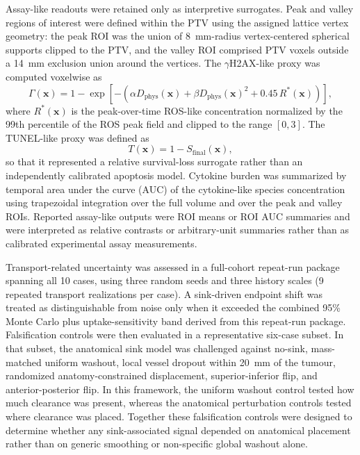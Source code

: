 \documentclass[10pt,a4paper]{article}
\begin{document}
Assay-like readouts were retained only as interpretive surrogates. Peak and valley regions of interest were defined within the PTV using the assigned lattice vertex geometry: the peak ROI was the union of 8~mm-radius vertex-centered spherical supports clipped to the PTV, and the valley ROI comprised PTV voxels outside a 14~mm exclusion union around the vertices. The $\gamma$H2AX-like proxy was computed voxelwise as
\begin{equation}
\Gamma(\mathbf{x}) = 1 - \exp\!\left[-\left(\alpha D_{\mathrm{phys}}(\mathbf{x}) + \beta D_{\mathrm{phys}}(\mathbf{x})^2 + 0.45\,R^*(\mathbf{x})\right)\right],
\end{equation}
where $R^*(\mathbf{x})$ is the peak-over-time ROS-like concentration normalized by the 99th percentile of the ROS peak field and clipped to the range $[0,3]$. The TUNEL-like proxy was defined as
\begin{equation}
T(\mathbf{x}) = 1 - S_{\mathrm{final}}(\mathbf{x}),
\end{equation}
so that it represented a relative survival-loss surrogate rather than an independently calibrated apoptosis model. Cytokine burden was summarized by temporal area under the curve (AUC) of the cytokine-like species concentration using trapezoidal integration over the full volume and over the peak and valley ROIs. Reported assay-like outputs were ROI means or ROI AUC summaries and were interpreted as relative contrasts or arbitrary-unit summaries rather than as calibrated experimental assay measurements.

Transport-related uncertainty was assessed in a full-cohort repeat-run package spanning all 10 cases, using three random seeds and three history scales (9 repeated transport realizations per case). A sink-driven endpoint shift was treated as distinguishable from noise only when it exceeded the combined 95\% Monte Carlo plus uptake-sensitivity band derived from this repeat-run package. Falsification controls were then evaluated in a representative six-case subset. In that subset, the anatomical sink model was challenged against no-sink, mass-matched uniform washout, local vessel dropout within 20~mm of the tumour, randomized anatomy-constrained displacement, superior-inferior flip, and anterior-posterior flip. In this framework, the uniform washout control tested how much clearance was present, whereas the anatomical perturbation controls tested where clearance was placed. Together these falsification controls were designed to determine whether any sink-associated signal depended on anatomical placement rather than on generic smoothing or non-specific global washout alone.
\end{document}
